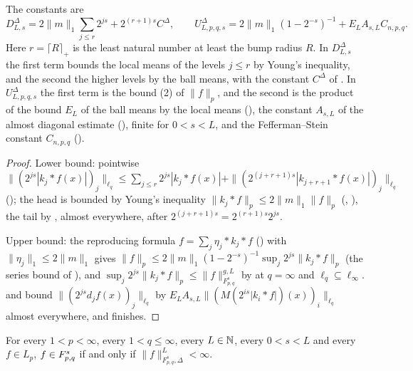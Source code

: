 The constants are
\[
  D^\Delta_{L,s} = 2 \|m\|_1 \sum_{j \leq r} 2^{js} + 2^{(r+1)s} C^\Delta , \qquad
  U^\Delta_{L,p,q,s} = 2 \|m\|_1 (1 - 2^{-s})^{-1} + E_L A_{s,L} C_{n,p,q} .
\]
Here $r = \lceil R \rceil_+$ is the least natural number at least the bump radius $R$. In
$D^\Delta_{L,s}$ the first term bounds the local means of the levels $j \leq r$ by Young's
inequality, and the second the higher levels by the ball means, with the constant $C^\Delta$ of
. In $U^\Delta_{L,p,q,s}$ the first term is the bound (2) of
$\|f\|_p$, and the second is the product of the bound $E_L$ of the ball means by the local means
(), the constant $A_{s,L}$ of the almost diagonal estimate
(), finite for $0 < s < L$, and the Fefferman--Stein constant
$C_{n,p,q}$ ().

\begin{proof}
\leanok
Lower bound: pointwise
$\|(2^{js} |k_j * f(x)|)_j\|_{\ell_q} \leq \sum_{j \leq r} 2^{js} |k_j * f(x)| +
\|(2^{(j+r+1)s} |k_{j+r+1} * f(x)|)_j\|_{\ell_q}$ (); the head is bounded by
Young's inequality $\|k_j * f\|_p \leq 2 \|m\|_1 \|f\|_p$ (,
), the tail by , almost
everywhere, after $2^{(j+r+1)s} = 2^{(r+1)s} 2^{js}$.

Upper bound: the reproducing formula $f = \sum_j \eta_j * k_j * f$ ()
with $\|\eta_j\|_1 \leq 2 \|m\|_1$ gives
$\|f\|_p \leq 2 \|m\|_1 (1 - 2^{-s})^{-1} \sup_j 2^{js} \|k_j * f\|_p$ (the series bound of
), and $\sup_j 2^{js} \|k_j * f\|_p \leq \|f\|^{g,L}_{F^s_{p,q}}$
by  at $q = \infty$ and $\ell_q \subseteq \ell_\infty$.
 and  bound
$\|(2^{js} d_j f(x))_j\|_{\ell_q}$ by $E_L A_{s,L} \|(M(2^{is} |k_i * f|)(x))_i\|_{\ell_q}$
almost everywhere, and  finishes.
\end{proof}

\begin{corollary}
\label{cor:tl-ball-means}
\leanok
{}
For every $1 < p < \infty$, every $1 < q \leq \infty$, every $L \in \mathbb{N}$, every $0 < s < L$ and
every $f \in L_p$, $f \in F^{s}_{p,q}$ if and only if $\|f\|^{L}_{F^s_{p,q}, \Delta} < \infty$.
\end{corollary}

